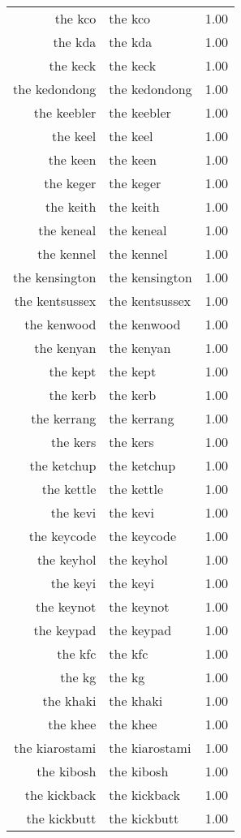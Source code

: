 \begin{table}[ht]
\begin{tabular}{rlr}
  the kco & the kco & 1.00 \\ 
  the kda & the kda & 1.00 \\ 
  the keck & the keck & 1.00 \\ 
  the kedondong & the kedondong & 1.00 \\ 
  the keebler & the keebler & 1.00 \\ 
  the keel & the keel & 1.00 \\ 
  the keen & the keen & 1.00 \\ 
  the keger & the keger & 1.00 \\ 
  the keith & the keith & 1.00 \\ 
  the keneal & the keneal & 1.00 \\ 
  the kennel & the kennel & 1.00 \\ 
  the kensington & the kensington & 1.00 \\ 
  the kentsussex & the kentsussex & 1.00 \\ 
  the kenwood & the kenwood & 1.00 \\ 
  the kenyan & the kenyan & 1.00 \\ 
  the kept & the kept & 1.00 \\ 
  the kerb & the kerb & 1.00 \\ 
  the kerrang & the kerrang & 1.00 \\ 
  the kers & the kers & 1.00 \\ 
  the ketchup & the ketchup & 1.00 \\ 
  the kettle & the kettle & 1.00 \\ 
  the kevi & the kevi & 1.00 \\ 
  the keycode & the keycode & 1.00 \\ 
  the keyhol & the keyhol & 1.00 \\ 
  the keyi & the keyi & 1.00 \\ 
  the keynot & the keynot & 1.00 \\ 
  the keypad & the keypad & 1.00 \\ 
  the kfc & the kfc & 1.00 \\ 
  the kg & the kg & 1.00 \\ 
  the khaki & the khaki & 1.00 \\ 
  the khee & the khee & 1.00 \\ 
  the kiarostami & the kiarostami & 1.00 \\ 
  the kibosh & the kibosh & 1.00 \\ 
  the kickback & the kickback & 1.00 \\ 
  the kickbutt & the kickbutt & 1.00 \\ 

\end{tabular}
\end{table}
